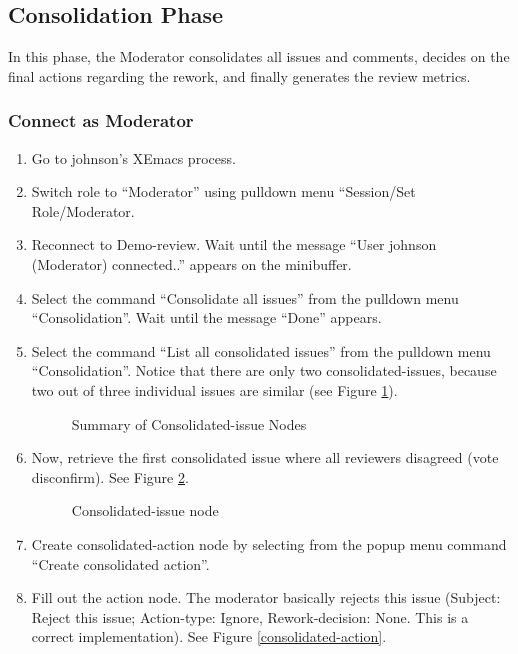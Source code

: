 \subsection{Consolidation Phase}
In this phase, the Moderator consolidates all issues and comments,
decides on the final actions regarding the rework, and finally
generates the review metrics.

\subsubsection{Connect as Moderator}
\begin{enumerate}
\item Go to johnson's XEmacs process.
\item Switch role to ``Moderator'' using  pulldown menu
``Session/Set Role/Moderator.
\item Reconnect to Demo-review. Wait until the message ``User
johnson (Moderator) connected..'' appears on the minibuffer.
\item Select the command ``Consolidate all issues'' from the pulldown
menu ``Consolidation''. Wait until the message ``Done'' appears.
\item Select the command ``List all consolidated issues''
from the pulldown menu ``Consolidation''.
Notice that there are only two consolidated-issues, because two out of
three individual issues are similar (see Figure
\ref{summary-consolidation}).
\begin{figure}[htb]
  {\centerline{}}
  \caption{Summary of Consolidated-issue Nodes}
  \label{summary-consolidation}
\end{figure}

\item Now, retrieve the first consolidated issue where all reviewers
disagreed (vote disconfirm). See Figure \ref{consolidated-issue}.

\begin{figure}[htb]
  {\centerline{}}
  \caption{Consolidated-issue node}
  \label{consolidated-issue}
\end{figure}

\item Create consolidated-action node by selecting from the popup menu
command ``Create consolidated action''. 

\item Fill out the action node. The moderator basically rejects this
issue (Subject: Reject this issue; Action-type: Ignore,
Rework-decision: None. This is a correct implementation).
See Figure \ref{consolidated-action}.


\end{enumerate}
